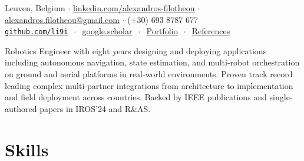 \documentclass[a4paper,10pt,twoside]{article}
\begin{document}

\par{\bigskip\par}

\begin{center}
\vspace{-0.5em}
  {\small
   Leuven, Belgium $\cdot$
  \href{https://www.linkedin.com/in/alexandros-filotheou/}{linkedin.com/alexandros-filotheou}
  $\cdot$ \href{mailto:alexandros.filotheou@gmail.com}{alexandros.filotheou@gmail.com} $\cdot$ (+30) 693 8787 677 \\
  \href{https://github.com/li9i/}{\texttt{github.com/li9i}} $\ \cdot\ $ \href{https://scholar.google.com/citations?hl=en&view_op=list_works&gmla=AKzYXQ2ZNs_wAOy2e75F24-NJ0AGC7eeo8hugORYe3HG61yfKTR1H8vsWVf-C05DUq2qxvo9xqCvr6kF3qWTB4dIM-IJ&user=9_hI4hMAAAAJ}{google.scholar} $\ \cdot\ $ \href{https://docs.google.com/viewerng/viewer?url=https://raw.githubusercontent.com/li9i/portfolio/master/portfolio.pdf}{Portfolio} $\ \cdot \ $ \href{https://docs.google.com/viewerng/viewer?url=https://raw.githubusercontent.com/li9i/cv/master/references/references_alexandros_filotheou.pdf}{References}
  }
\end{center}\vspace{-0.75em}

\begin{gg_box} \small
Robotics Engineer with eight years designing and deploying applications including autonomous navigation, state estimation, and multi-robot orchestration on ground and aerial platforms in real-world environments. Proven track record leading complex multi-partner integrations from architecture to implementation and field deployment across countries. Backed by IEEE publications and single-authored papers in IROS'24 and R\&AS.
\end{gg_box}

\section{\textbf{Skills}}\verticalspacebetweensectionandcontent\vspace{-1.75em}
\end{document}
